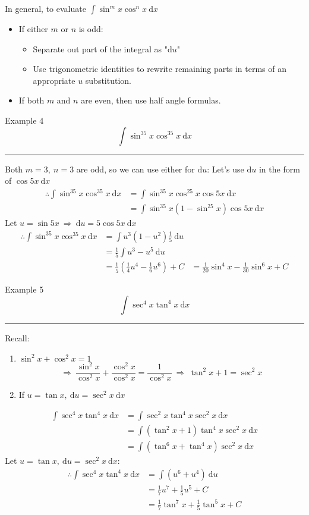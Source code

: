 \documentclass[12pt,a4paper]{article}
\def\d{{\mathrm{d}}}
\begin{document}
\begin{thm}{In general, to evaluate $\displaystyle\int\sin^mx\cos^nx\ \d x$}
	\begin{itemize}
		\item If either $m$ or $n$ is odd: 
		\begin{itemize}
			\item Separate out part of the integral as "$\d u$"
			\item Use trigonometric identities to rewrite remaining parts in terms of an appropriate $u$ substitution.
		\end{itemize}
		\item If both $m$ and $n$ are even, then use half angle formulas. 
	\end{itemize}
\end{thm}
\begin{eg}{Example 4}
	$$\int\sin^35x\cos^35x\ \d x$$
	\noindent\rule[0.25\baselineskip]{\textwidth}{1pt}
	Both $m=3,\ n=3$ are odd, so we can use either for $\d u$: Let's use $\d u$ in the form of $\cos{5x}\ \d x$
	$$\begin{aligned}
		\therefore\int\sin^35x\cos^35x\ \d x&=\int\sin^35x\cos^25x\cos{5x}\ \d x\\
		&=\int\sin^35x(1-\sin^25x)\cos5x\ \d x
	\end{aligned}$$
	Let $u=\sin5x\ \Rightarrow\ \d u=5\cos5x\ \d x$
	$$\begin{aligned}
		\therefore\int\sin^35x\cos^35x\ \d x&=\int u^3\left(1-u^2\right)\frac{1}{5}\ \d u\\
		&=\frac{1}{5}\int u^3-u^5\ \d u\\
		&=\frac{1}{5}\left(\frac{1}{4}u^4-\frac{1}{6}u^6\right)+C
		&=\frac{1}{20}\sin^4x-\frac{1}{30}\sin^6x+C
	\end{aligned}$$
\end{eg}
\begin{eg}{Example 5}
	$$\int\sec^4x\tan^4x\ \d x$$
	\noindent\rule[0.25\baselineskip]{\textwidth}{1pt}
	\begin{tcolorbox}Recall: \begin{enumerate}
		\item $\sin^2x+\cos^2x=1$ $$\Rightarrow\ \frac{\sin^2x}{\cos^2x}+\frac{\cos^2x}{\cos^2x}=\frac{1}{\cos^2x}\ \Rightarrow\ \tan^2x+1=\sec^2x$$
		\item If $u=\tan{x},\ \d u=\sec^2x\ \d x$
	\end{enumerate}\end{tcolorbox}
	$$\begin{aligned}
		\int\sec^4x\tan^4x\ \d x&=\int\sec^2x\tan^4x\sec^2x\ \d x\\
		&=\int\left(\tan^2x+1\right)\tan^4x\sec^2x\ \d x\\
		&=\int\left(\tan^6x+\tan^4x\right)\sec^2x\ \d x
	\end{aligned}$$
	Let $u=\tan{x},\ \d u=\sec^2{x}\ \d x$: 
	$$\begin{aligned}
		\therefore\int\sec^4x\tan^4x\ \d x&=\int\left(u^6+u^4\right)\ \d u\\
		&=\frac{1}{7}u^7+\frac{1}{5}u^5+C\\
		&=\frac{1}{7}\tan^7x+\frac{1}{5}\tan^5x+C
	\end{aligned}$$
\end{eg}
\end{document}
